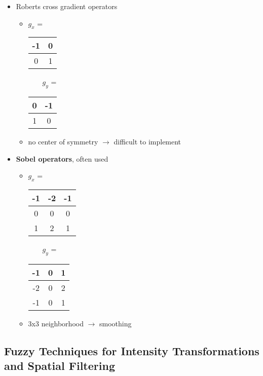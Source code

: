 \begin{itemize}
	\item Roberts cross gradient operators
		\begin{itemize}
		\item $g_x$ = \begin{tabular}{|c|c|} \hline
		-1 & 0 \\ \hline
		 0 & 1 \\ \hline
		\end{tabular}
		$\qquad g_y$ = \begin{tabular}{|c|c|} \hline
		 0 &-1 \\ \hline
		 1 & 0 \\ \hline
		\end{tabular}
	\item no center of symmetry $\rightarrow$ difficult to implement
	\end{itemize}
		\item  \textbf{Sobel operators}, often used
		\begin{itemize}
		\item $g_x$ =  
        \begin{tabular}{|c|c|c|} \hline
		      -1 &-2 &-1 \\ \hline
		       0 & 0 & 0 \\ \hline
		       1 & 2 & 1 \\ \hline
		    \end{tabular}
		    $\qquad g_y$ = 
        \begin{tabular}{|c|c|c|} \hline
		      -1 & 0 & 1 \\ \hline
	      	-2 & 0 & 2 \\ \hline
	      	-1 & 0 & 1 \\ \hline
		    \end{tabular}
		\item 3x3 neighborhood $\rightarrow$ smoothing
		\end{itemize}
\end{itemize}

\subsection{Fuzzy Techniques for Intensity Transformations and Spatial Filtering }